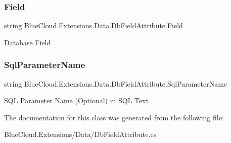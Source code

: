 \subsubsection{\texorpdfstring{Field}{Field}}
{\footnotesize\ttfamily string Blue\+Cloud.\+Extensions.\+Data.\+Db\+Field\+Attribute.\+Field\hspace{0.3cm}{\ttfamily [get]}}



Database Field 

\mbox{\label{class_blue_cloud_1_1_extensions_1_1_data_1_1_db_field_attribute_a87545da9d89ae282b3ade4616b960938}} 
\subsubsection{\texorpdfstring{Sql\+Parameter\+Name}{SqlParameterName}}
{\footnotesize\ttfamily string Blue\+Cloud.\+Extensions.\+Data.\+Db\+Field\+Attribute.\+Sql\+Parameter\+Name\hspace{0.3cm}{\ttfamily [get]}}



S\+QL Parameter Name (Optional) in S\+QL Text 



The documentation for this class was generated from the following file\+:\begin{DoxyCompactItemize}
\item 
Blue\+Cloud.\+Extensions/\+Data/Db\+Field\+Attribute.\+cs\end{DoxyCompactItemize}
